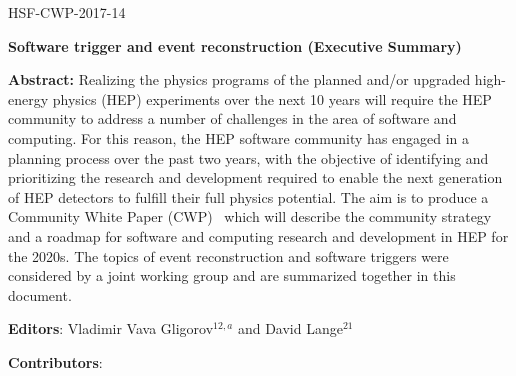 \begin{flushright}
HSF-CWP-2017-14
\end{flushright}

\Large
\begin{center}
{\bf Software trigger and event reconstruction (Executive Summary)}
\end{center}
\vskip 1cm

\normalsize


\hangindent=1cm
{\bf Abstract:} Realizing the physics programs of the planned and/or upgraded high-energy physics (HEP) experiments over the next 10 years will require the HEP community to address a number of challenges in the area of software and computing. For this reason, the HEP software community has engaged in a planning process over the past two years, with the objective of identifying and prioritizing the research and development required to enable the next generation of HEP detectors to fulfill their full physics potential. The aim is to produce a Community White Paper (CWP)~\cite{HSF2017} which will describe the community strategy and a roadmap for software and computing research and development in HEP for the 2020s. The topics of event reconstruction and software triggers were considered by a joint working group and are summarized together in this document.

\vskip 1cm


\hangindent=1cm
{\bf Editors}: Vladimir Vava Gligorov$^{12,a}$ and David Lange$^{21}$

\vskip 0.2cm
\hangindent=1cm
{\bf Contributors}:

